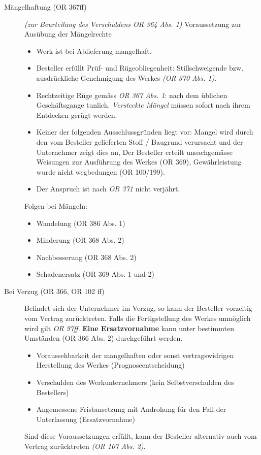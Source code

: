 \begin{description}
  \item[Mängelhaftung (OR 367ff)] \textit{(zur Beurteilung des Verschuldens OR 364 Abs. 1)}
  Voraussetzung zur Ausübung der Mängelrechte
  \begin{itemize}
    \item Werk ist bei Ablieferung mangelhaft.
    \item Besteller erfüllt Prüf- und Rügeobliegenheit: Stillschweigende bzw. ausdrückliche Genehmigung des Werkes \textit{(OR 370 Abs. 1)}.
    \item Rechtzeitige Rüge gemäss \textit{OR 367 Abs. 1}: nach dem üblichen Geschäftsgange tunlich. \textit{Versteckte Mängel} müssen sofort nach ihrem Entdecken gerügt werden. 
    \item Keiner der folgenden Ausschlussgründen liegt vor: Mangel wird durch den vom Besteller gelieferten Stoff / Baugrund verursacht und der Unternehmer zeigt dies an, Der Besteller erteilt unsachgemässe Weisungen zur Ausführung des Werkes (OR 369), Gewährleistung wurde nicht wegbedungen (OR 100/199).
    \item Der Anspruch ist nach \textit{OR 371} nicht verjährt.
  \end{itemize}

  Folgen bei Mängeln:
  \begin{itemize}
    \item Wandelung (OR 386 Abs. 1)
    \item Minderung (OR 368 Abs. 2)
    \item Nachbesserung (OR 368 Abs. 2)
    \item Schadenersatz (OR 369 Abs. 1 und 2)
  \end{itemize}

  \item[Bei Verzug (OR 366, OR 102 ff)]
  Befindet sich der Unternehmer im Verzug, so kann der Besteller vorzeitig vom Vertrag zurücktreten. Falls die Fertigstellung des Werkes unmöglich wird gilt \textit{OR 97ff}.
  \textbf{Eine Ersatzvornahme} kann unter bestimmten Umständen (OR 366 Abs. 2) durchgeführt werden.
  \begin{itemize}
    \item Voraussehbarkeit der mangelhaften oder sonst vertragswidrigen Herstellung des Werkes (Prognoseentscheidung)
    \item Verschulden des Werkunternehmers (kein Selbstverschulden des Bestellers)
    \item Angemessene Fristansetzung mit Androhung für den Fall der Unterlassung (Ersatzvornahme)
  \end{itemize}
  Sind diese Voraussetzungen erfüllt, kann der Besteller alternativ auch vom Vertrag zurücktreten \textit{(OR 107 Abs. 2)}.
    

\end{description}
